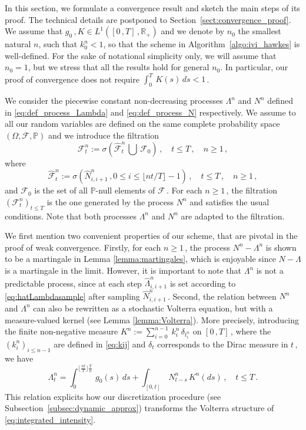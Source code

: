 \documentclass{article}
\newcommand{\R}{\mathbb{R}}
\newcommand{\1}{\mathbbm{1}}
\numberwithin{equation}{section}
\begin{document}
\label{sect:convergence}
In this section, we formulate a convergence result and sketch the main steps of its proof. The technical details are postponed to Section~\ref{sect:convergence_proof}. We assume that $g_0\,,K \in L^1([0\,,T]\,, \R_+)$ and we denote by $n_0$ the smallest natural $n$, such that $k_0^n < 1$, so that the scheme in Algorithm~\ref{algo:ivi_hawkes} is well-defined. For the sake of notational simplicity {only}, we will {assume that} $n_0 = 1$, but we stress that all the results hold for general $n_0$. In particular, our proof of convergence does not require $\int_0^T \,K(s)\,ds < 1\,$.


    We consider the piecewise constant non-decreasing processes $\Lambda^n$ and $N^n$ defined in \eqref{eq:def_process_Lambda} and \eqref{eq:def_process_N} respectively.
We assume to all our random variables are defined on the same complete probability space $\left(\Omega, \mathcal F , \mathbb P\right)$ and we introduce the filtration 
\begin{equation}
\label{eq:def_filtration}
\mathcal F^n_t := \sigma\left(\widehat{\mathcal{F}}^n_t\, \bigcup \, \mathcal F_0\right)\,, \quad t \leq T\,, \quad n \geq 1\,,
\end{equation}
where 
$$
\widehat{\mathcal{F}}^n_t := \sigma\left(\widehat N^n_{i,i+1}\,, 0 \leq i \leq \lfloor nt /T \rfloor -1\right)\,, \quad t \leq T\,, \quad n \geq 1\,, 
$$
and $\mathcal F_0$ is the set of all $\mathbb P$-null elements of $\mathcal F\,$. For each $n \geq 1\,$, the filtration $\left(\mathcal F^n_t\right)_{t \leq T}$ is the one generated by the process $ N^n$ and satisfies the usual conditions. Note that both processes $\Lambda^n$ and $N^n$ are adapted to the filtration.

We first mention two convenient properties of our scheme, that are pivotal in the proof of weak convergence. Firstly, for each $n \geq 1\,$, the process $N^n - \Lambda^n$ is shown to be a martingale in Lemma \ref{lemma:martingales}, which is enjoyable since $N - \Lambda$ is a martingale in the limit. However, it is important to note that $\Lambda^n$ is not a predictable process, since at each step $\widehat \Lambda^n_{i,i+1}$ is set according to \eqref{eq:hatLambdasample} after sampling $\widehat N^n_{i,i+1}\,$. Second, the relation between $N^n$ and $\Lambda^n$ can also be rewritten as a stochastic Volterra equation, but with a measure-valued kernel (see Lemma \ref{lemma:Volterra}). More precisely, introducing the finite non-negative measure $K^n := \sum_{i = 0}^{n-1}\,k_i^n\,\delta_{t^n_i}$ on $[0\,,T]\,$, where the $\left(k^n_i\right)_{i \leq n-1}$ are defined in \eqref{eq:kij} and $\delta_{t}$ corresponds to the Dirac measure in $t\,$, we have
$$
\Lambda^n_t = \int_0^{\lfloor \frac{nt}{T} \rfloor \frac{T}{n}}\,g_0(s)\,ds + \int_{[0,t]}\,N^n_{t-s}\,K^n(ds)\,, \quad t \leq T\,.
$$
This relation explicits how our discretization procedure (see Subsection~\ref{subsec:dynamic_approx}) transforms the Volterra structure of \eqref{eq:integrated_intensity}.
\end{document}
